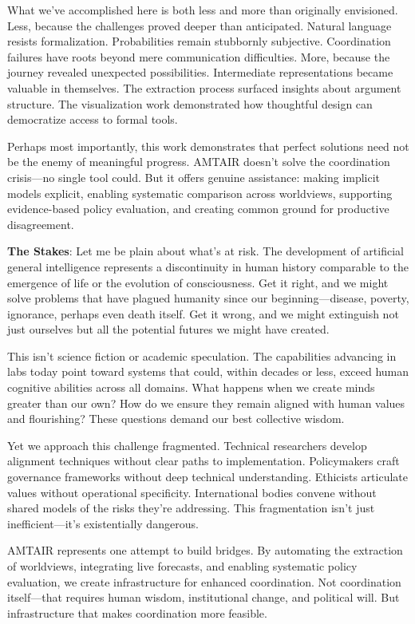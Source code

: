 \documentclass[
  11pt,
  letterpaper,
]{book}
\begin{document}
What we've accomplished here is both less and more than originally
envisioned. Less, because the challenges proved deeper than anticipated.
Natural language resists formalization. Probabilities remain stubbornly
subjective. Coordination failures have roots beyond mere communication
difficulties. More, because the journey revealed unexpected
possibilities. Intermediate representations became valuable in
themselves. The extraction process surfaced insights about argument
structure. The visualization work demonstrated how thoughtful design can
democratize access to formal tools.

Perhaps most importantly, this work demonstrates that perfect solutions
need not be the enemy of meaningful progress. AMTAIR doesn't solve the
coordination crisis---no single tool could. But it offers genuine
assistance: making implicit models explicit, enabling systematic
comparison across worldviews, supporting evidence-based policy
evaluation, and creating common ground for productive disagreement.

\textbf{The Stakes}: Let me be plain about what's at risk. The
development of artificial general intelligence represents a
discontinuity in human history comparable to the emergence of life or
the evolution of consciousness. Get it right, and we might solve
problems that have plagued humanity since our beginning---disease,
poverty, ignorance, perhaps even death itself. Get it wrong, and we
might extinguish not just ourselves but all the potential futures we
might have created.

This isn't science fiction or academic speculation. The capabilities
advancing in labs today point toward systems that could, within decades
or less, exceed human cognitive abilities across all domains. What
happens when we create minds greater than our own? How do we ensure they
remain aligned with human values and flourishing? These questions demand
our best collective wisdom.

Yet we approach this challenge fragmented. Technical researchers develop
alignment techniques without clear paths to implementation. Policymakers
craft governance frameworks without deep technical understanding.
Ethicists articulate values without operational specificity.
International bodies convene without shared models of the risks they're
addressing. This fragmentation isn't just inefficient---it's
existentially dangerous.

AMTAIR represents one attempt to build bridges. By automating the
extraction of worldviews, integrating live forecasts, and enabling
systematic policy evaluation, we create infrastructure for enhanced
coordination. Not coordination itself---that requires human wisdom,
institutional change, and political will. But infrastructure that makes
coordination more feasible.
\end{document}
